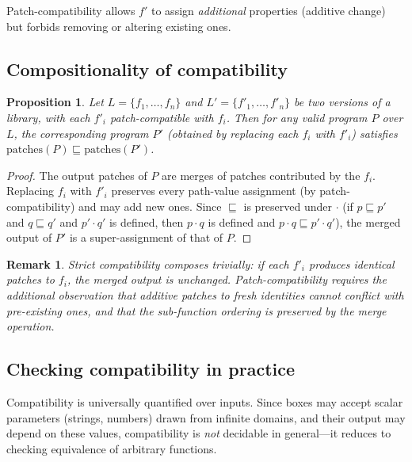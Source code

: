 \documentclass[11pt]{article}
\newtheorem{proposition}[theorem]{Proposition}
\newtheorem{remark}[theorem]{Remark}
\begin{document}
    Patch-compatibility allows $f'$ to assign \emph{additional} properties (additive
    change) but forbids removing or altering existing ones.

    \subsection{Compositionality of compatibility}

    \begin{proposition}\label{prop:compose-compat}
        Let $L = \{f_1, \ldots, f_n\}$ and $L' = \{f'_1, \ldots, f'_n\}$ be two versions
        of a library, with each $f'_i$ patch-compatible with $f_i$. Then for any valid
        program $P$ over $L$, the corresponding program $P'$ (obtained by replacing each
        $f_i$ with $f'_i$) satisfies $\mathrm{patches}(P) \sqsubseteq \mathrm{patches}(P')$.
    \end{proposition}

    \begin{proof}
        The output patches of $P$ are merges of patches contributed by the $f_i$.
        Replacing $f_i$ with $f'_i$ preserves every path-value assignment (by
        patch-compatibility) and may add new ones. Since $\sqsubseteq$ is preserved under
        $\cdot$ (if $p \sqsubseteq p'$ and $q \sqsubseteq q'$ and $p' \cdot q'$ is
        defined, then $p \cdot q$ is defined and $p \cdot q \sqsubseteq p' \cdot q'$),
        the merged output of $P'$ is a super-assignment of that of $P$.
    \end{proof}

    \begin{remark}
        Strict compatibility composes trivially: if each $f'_i$ produces identical patches
        to $f_i$, the merged output is unchanged. Patch-compatibility requires the
        additional observation that additive patches to fresh identities cannot conflict
        with pre-existing ones, and that the sub-function ordering is preserved by the
        merge operation.
    \end{remark}

    \subsection{Checking compatibility in practice}

    Compatibility is universally quantified over inputs. Since boxes may accept scalar
    parameters (strings, numbers) drawn from infinite domains, and their output may depend
    on these values, compatibility is \emph{not} decidable in general---it reduces to
    checking equivalence of arbitrary functions.
\end{document}
